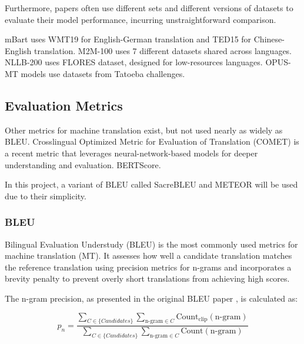 \documentclass[a4paper]{article}
\begin{document}
Furthermore, papers often use different sets and different versions of datasets to evaluate their model performance, incurring unstraightforward comparison.

mBart \cite{liu-2020-mbart} uses WMT19 for English-German translation and TED15 for Chinese-English translation. M2M-100 \cite{fan-2020-m2m100} uses 7 different datasets shared across languages. NLLB-200  \cite{nllb200-2020} uses FLORES dataset, designed for low-resources languages. OPUS-MT \cite{tiedemann-2023-democratizing,tiedemann-2020-opus-mt} models use datasets from Tatoeba challenges.


\subsection{Evaluation Metrics}

Other metrics for machine translation exist, but not used nearly as widely as BLEU. Crosslingual Optimized Metric for Evaluation of Translation (COMET) \cite{rei-2020-comet} is a recent metric that leverages neural-network-based models for deeper understanding and evaluation. BERTScore.

In this project, a variant of BLEU called SacreBLEU and METEOR will be used due to their simplicity.


\subsubsection{BLEU}

Bilingual Evaluation Understudy (BLEU) \cite{papieni-2002-bleu} is the most commonly used metrics for machine translation (MT). It assesses how well a candidate translation matches the reference translation using precision metrics for n-grams and incorporates a brevity penalty to prevent overly short translations from achieving high scores.

The n-gram precision, as presented in the original BLEU paper \cite{papieni-2002-bleu}, is calculated as:

\begin{equation}
    p_n = \frac{\sum_{C \in \{Candidates\}} \sum_{\text{n-gram} \in C} \text{Count}_{\text{clip}}(\text{n-gram})}{\sum_{C \in \{Candidates\}} \sum_{\text{n-gram} \in C} \text{Count}(\text{n-gram})}
\end{equation}
\end{document}
